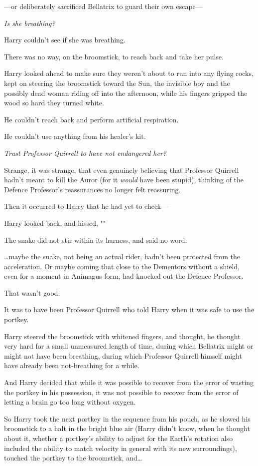 —or deliberately sacrificed Bellatrix to guard their own escape—

\emph{Is she breathing?}

Harry couldn’t see if she was breathing.

There was no way, on the broomstick, to reach back and take her pulse.

Harry looked ahead to make sure they weren’t about to run into any flying
rocks, kept on steering the broomstick toward the Sun, the invisible boy and
the possibly dead woman riding off into the afternoon, while his fingers
gripped the wood so hard they turned white.

He couldn’t reach back and perform artificial respiration.

He couldn’t use anything from his healer’s kit.

\emph{Trust Professor Quirrell to have not endangered her?}

Strange, it was strange, that even genuinely believing that Professor Quirrell
hadn’t meant to kill the Auror (for it \emph{would} have been stupid), thinking
of the Defence Professor’s reassurances no longer felt reassuring.

Then it occurred to Harry that he had yet to check—

Harry looked back, and hissed, ""

The snake did not stir within its harness, and said no word.

…maybe the snake, not being an actual rider, hadn’t been protected from
the acceleration. Or maybe coming that close to the Dementors without a shield,
even for a moment in Animagus form, had knocked out the Defence Professor.

That wasn’t good.

It was to have been Professor Quirrell who told Harry when it was safe to use
the portkey.

Harry steered the broomstick with whitened fingers, and thought, he thought
very hard for a small unmeasured length of time, during which Bellatrix might
or might not have been breathing, during which Professor Quirrell himself might
have already been not-breathing for a while.

And Harry decided that while it was possible to recover from the error of
wasting the portkey in his possession, it was not possible to recover from the
error of letting a brain go too long without oxygen.

So Harry took the next portkey in the sequence from his pouch, as he slowed his
broomstick to a halt in the bright blue air (Harry didn’t know, when he thought
about it, whether a portkey’s ability to adjust for the Earth’s rotation also
included the ability to match velocity in general with its new surroundings),
touched the portkey to the broomstick, and…

